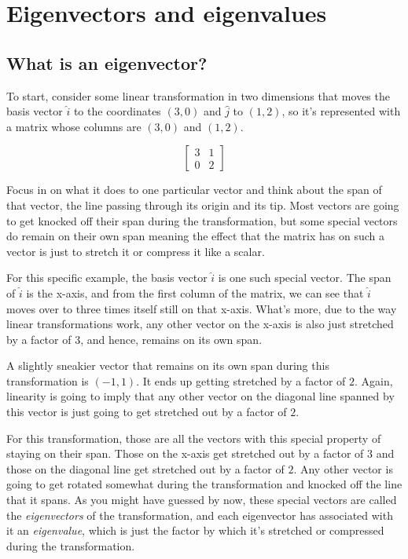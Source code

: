 \section{Eigenvectors and eigenvalues}

\subsection{What is an eigenvector?}

To start, consider some linear transformation in two dimensions that moves the
basis vector $\hat{i}$ to the coordinates $(3, 0)$ and $\hat{j}$ to $(1, 2)$, so
it's represented with a matrix whose columns are $(3, 0)$ and $(1, 2)$.

\begin{equation*}
  \begin{bmatrix}
    3 & 1 \\
    0 & 2
  \end{bmatrix}
\end{equation*}

Focus in on what it does to one particular vector and think about the span of
that vector, the line passing through its origin and its tip. Most vectors are
going to get knocked off their span during the transformation, but some special
vectors do remain on their own span meaning the effect that the matrix has on
such a vector is just to stretch it or compress it like a scalar.

For this specific example, the basis vector $\hat{i}$ is one such special
vector. The span of $\hat{i}$ is the x-axis, and from the first column of the
matrix, we can see that $\hat{i}$ moves over to three times itself still on that
x-axis. What's more, due to the way linear transformations work, any other
vector on the x-axis is also just stretched by a factor of $3$, and hence,
remains on its own span.

A slightly sneakier vector that remains on its own span during this
transformation is $(-1, 1)$. It ends up getting stretched by a factor of $2$.
Again, linearity is going to imply that any other vector on the diagonal line
spanned by this vector is just going to get stretched out by a factor of $2$.

For this transformation, those are all the vectors with this special property of
staying on their span. Those on the x-axis get stretched out by a factor of $3$
and those on the diagonal line get stretched out by a factor of $2$. Any other
vector is going to get rotated somewhat during the transformation and knocked
off the line that it spans. As you might have guessed by now, these special
vectors are called the \textit{eigenvectors} of the transformation, and each
eigenvector has associated with it an \textit{eigenvalue}, which is just the
factor by which it's stretched or compressed during the transformation.

